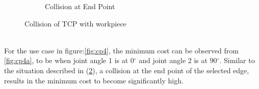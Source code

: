 \begin{figure}[!htbp]
\begin{subfigure}[b]{0.4\textwidth}
		\caption{Collision at End Point}  
		\label{fig:collg}
	\end{subfigure}	
	\caption{Collision of TCP with workpiece}
	\label{fig:coll}
\end{figure}\\
For the use case in figure:\ref{fig:cp4}, the minimum cost can be observed from \ref{fig:cp4a}, to be when joint angle 1 is at 0$^{\circ}$ and joint angle 2 is at 90$^{\circ}$. Similar to the situation described in (\ref{fig:coll}), a collision at the end point of the selected edge, results in the minimum cost to become significantly high.
